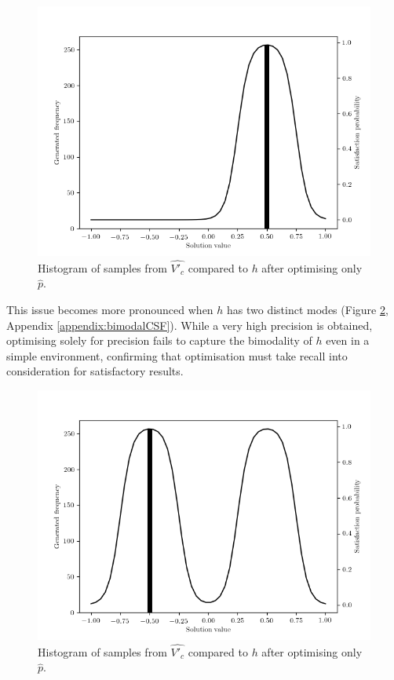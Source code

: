 \documentclass[../../main.tex]{subfiles}
\begin{document}
\begin{figure}[H]
    \begin{center}
    \includegraphics[width=\textwidth]{sigmoidBumpHistogram}
    \caption{
        Histogram of samples from $\hat{V'_c}$ compared to $h$ after optimising only $\hat{p}$.
    }
    \label{fig:sigmoidBumpHistogram}
    \end{center}
\end{figure}
This issue becomes more pronounced when $h$ has two distinct modes (Figure \ref{fig:sigmoidBumpHistogramBimodal}, Appendix \ref{appendix:bimodalCSF}).
While a very high precision is obtained, optimising solely for precision fails to capture the bimodality of $h$ even in a simple environment, confirming that optimisation must take recall into consideration for satisfactory results.
\begin{figure}[H]
    \begin{center}
    \includegraphics[width=\textwidth]{sigmoidBumpHistogramBimodal}
    \caption{
        Histogram of samples from $\hat{V'_c}$ compared to $h$ after optimising only $\hat{p}$.
    }
    \label{fig:sigmoidBumpHistogramBimodal}
    \end{center}
\end{figure}
\end{document}
